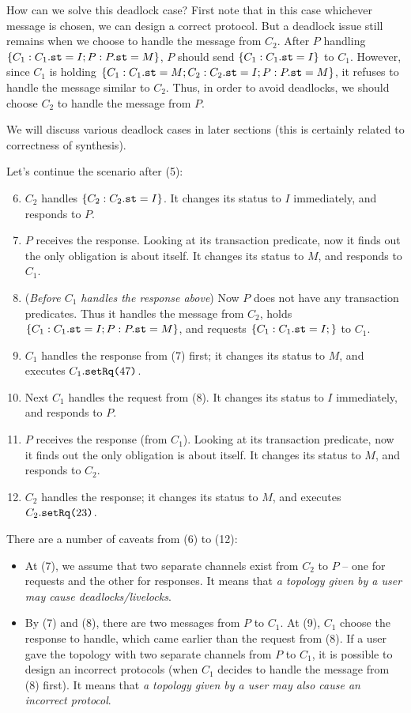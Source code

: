 \documentclass[format=manuscript]{acmart}
\begin{document}
How can we solve this deadlock case? First note that in this case whichever
message is chosen, we can design a correct protocol. But a deadlock issue still
remains when we choose to handle the message from $C_2$. After $P$ handling $\{
C_1: C_1.\texttt{st} = I; P: P.\texttt{st} = M \}$, $P$ should send $\{ C_1: C_1.\texttt{st} =
I \}$ to $C_1$. However, since $C_1$ is holding $\{ C_1: C_1.\texttt{st} = M; C_2:
C_2.\texttt{st} = I; P: P.\texttt{st} = M \}$, it refuses to handle the message similar to
$C_2$. Thus, in order to avoid deadlocks, we should choose $C_2$ to handle the
message from $P$.

We will discuss various deadlock cases in later sections (this is certainly
related to correctness of synthesis).

Let's continue the scenario after (5):

\begin{enumerate}
  \setcounter{enumi}{5}
\item $C_2$ handles $\{ C_2: C_2.\texttt{st} = I \}$. It changes its status to $I$
  immediately, and responds to $P$.
\item $P$ receives the response. Looking at its transaction predicate, now it
  finds out the only obligation is about itself. It changes its status to $M$,
  and responds to $C_1$.
\item (\emph{Before $C_1$ handles the response above}) Now $P$ does not have any
  transaction predicates. Thus it handles the message from $C_2$, holds $\{ C_1:
  C_1.\texttt{st} = I; P: P.\texttt{st} = M \}$, and requests $\{ C_1: C_1.\texttt{st} = I; \}$
  to $C_1$.
\item $C_1$ handles the response from (7) first; it changes its status to $M$,
  and executes $C_1.\texttt{setRq(}47\texttt{)}$.
\item Next $C_1$ handles the request from (8). It changes its status to $I$
  immediately, and responds to $P$.
\item $P$ receives the response (from $C_1$). Looking at its transaction
  predicate, now it finds out the only obligation is about itself. It changes
  its status to $M$, and responds to $C_2$.
\item $C_2$ handles the response; it changes its status to $M$, and executes
  $C_2.\texttt{setRq(}23\texttt{)}$.
\end{enumerate}

There are a number of caveats from (6) to (12):

\begin{itemize}
\item At (7), we assume that two separate channels exist from $C_2$ to $P$ --
  one for requests and the other for responses. It means that \emph{a topology
    given by a user may cause deadlocks/livelocks}.
\item By (7) and (8), there are two messages from $P$ to $C_1$. At (9), $C_1$
  choose the response to handle, which came earlier than the request from (8).
  If a user gave the topology with two separate channels from $P$ to $C_1$, it
  is possible to design an incorrect protocols (when $C_1$ decides to handle the
  message from (8) first). It means that \emph{a topology given by a user may
    also cause an incorrect protocol}.
\end{itemize}
\end{document}
